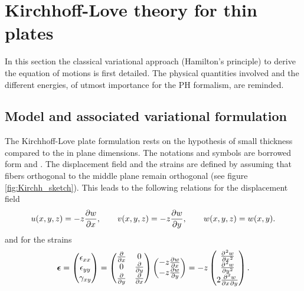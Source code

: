 \documentclass[preprint,12pt]{elsarticle}
\begin{document}
	\section{Kirchhoff-Love theory for thin plates}
	In this section the classical variational approach (Hamilton's principle) to derive the equation of motions is first detailed. The physical quantities involved and the different energies, of utmost importance for the PH formalism, are reminded.
	
	
	\subsection{Model and associated variational formulation}
	\label{sec:VarKir}
	The Kirchhoff-Love plate formulation rests on the hypothesis of small thickness compared to the in plane dimensions. The notations and symbols are borrowed form \cite{FEM_Cook} and \cite{Oslo}. The displacement field and the strains are defined by assuming that fibers orthogonal to the middle plane remain orthogonal (see figure \ref{fig:Kirchh_sketch}). This leads to the following relations for the displacement field 
	\begin{equation}
	u(x,y,z) = -z \diffp{w}{x}, \qquad v(x,y,z) = -z \diffp{w}{y}, \qquad 
	w(x,y,z) = w(x,y).
	\end{equation}
	and for the strains
	\begin{equation}
	\bm{\epsilon} =  
	\begin{pmatrix}
	\epsilon_{xx} \\
	\epsilon_{yy} \\
	\gamma_{xy} \\
	\end{pmatrix}  = 
	\begin{pmatrix}
	\diffp{}{x} & 0 \\
	0 & \diffp{}{y} \\
	\diffp{}{y} & \diffp{}{x} \\
	\end{pmatrix}
	\begin{pmatrix}
	-z \diffp{w}{x}\\
	-z \diffp{w}{y}\\
	\end{pmatrix} = 
	-z
	\begin{pmatrix}
	\diffp[2]{w}{x} \\
	\diffp[2]{w}{y} \\
	2 \diffp{w}{x,y} \\
	\end{pmatrix}. 
	\end{equation}
\end{document}
